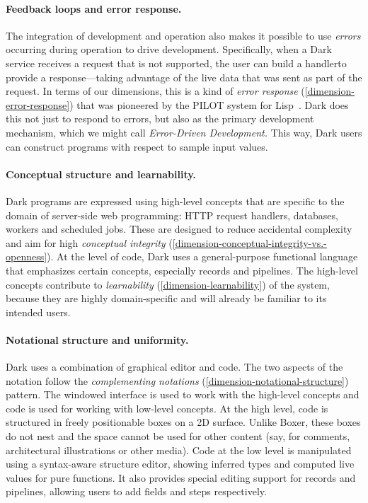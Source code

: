 \documentclass[english,submission]{programming}
\providecommand{\DIFadd}[1]{{\protect\color{blue}\uwave{#1}}} %
\providecommand{\DIFaddbegin}{} %
\providecommand{\DIFaddend}{} %
\begin{document}
\paragraph{Feedback loops and error response.}

The integration of development and operation also makes it possible to
use \emph{errors} occurring during operation to drive development.
Specifically, when a Dark service receives a request that is not
supported, the user can build a handler\DIFaddbegin \DIFadd{~\mbox{%
\cite{DarkErrors} }\hspace{0pt}%
}\DIFaddend to provide a
response---taking advantage of the live data that was sent as part of
the request. In terms of our dimensions, this is a kind of \emph{error
response} (\ref{dimension-error-response}) that was pioneered by the
PILOT system for Lisp~\cite{Pilot}. Dark does this not just to respond
to errors, but also as the primary development mechanism, which we might
call \emph{Error-Driven Development.} This way, Dark users can construct
programs with respect to sample input values.

\paragraph{Conceptual structure and learnability.}

Dark programs are expressed using high-level concepts that are specific
to the domain of server-side web programming: HTTP request handlers,
databases, workers and scheduled jobs. These are designed to reduce
accidental complexity and aim for high \emph{conceptual integrity}
(\ref{dimension-conceptual-integrity-vs.-openness}). At the level of
code, Dark uses a general-purpose functional language that emphasizes
certain concepts, especially records and pipelines. The high-level
concepts contribute to \emph{learnability}
(\ref{dimension-learnability}) of the system, because they are highly
domain-specific and will already be familiar to its intended users.

\paragraph{Notational structure and uniformity.}

Dark uses a combination of graphical editor and code. The two aspects of
the notation follow the \emph{complementing notations}
(\ref{dimension-notational-structure}) pattern. The windowed interface
is used to work with the high-level concepts and code is used for
working with low-level concepts. At the high level, code is structured
in freely positionable boxes on a 2D surface. Unlike Boxer\DIFaddbegin \DIFadd{~}\DIFaddend \cite{Boxer},
these boxes do not nest and the space cannot be used for other content
(say, for comments, architectural illustrations or other media). Code at
the low level is manipulated using a syntax-aware structure editor,
showing inferred types and computed live values for pure functions. It
also provides special editing support for records and pipelines,
allowing users to add fields and steps respectively.
\end{document}
